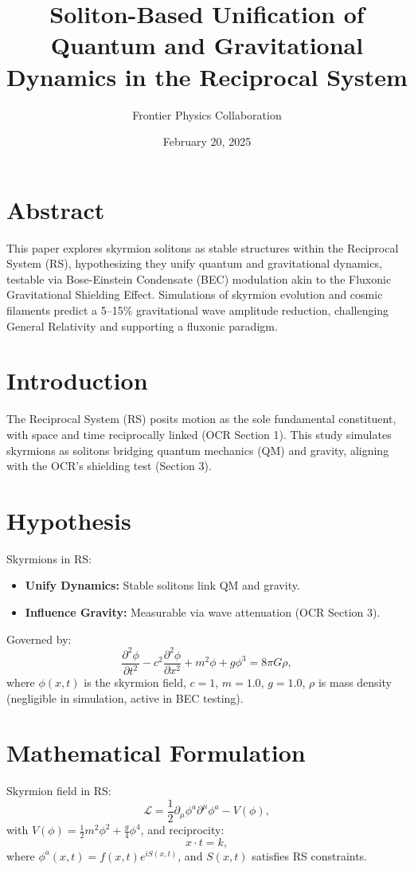 \documentclass{article}
\title{Soliton-Based Unification of Quantum and Gravitational Dynamics in the Reciprocal System}
\author{Frontier Physics Collaboration}
\date{February 20, 2025}
\begin{document}
\maketitle

\section*{Abstract}
This paper explores skyrmion solitons as stable structures within the Reciprocal System (RS), hypothesizing they unify quantum and gravitational dynamics, testable via Bose-Einstein Condensate (BEC) modulation akin to the Fluxonic Gravitational Shielding Effect. Simulations of skyrmion evolution and cosmic filaments predict a 5–15\% gravitational wave amplitude reduction, challenging General Relativity and supporting a fluxonic paradigm.

\section{Introduction}
The Reciprocal System (RS) posits motion as the sole fundamental constituent, with space and time reciprocally linked (OCR Section 1). This study simulates skyrmions as solitons bridging quantum mechanics (QM) and gravity, aligning with the OCR’s shielding test (Section 3).

\section{Hypothesis}
Skyrmions in RS:
\begin{itemize}
    \item \textbf{Unify Dynamics:} Stable solitons link QM and gravity.
    \item \textbf{Influence Gravity:} Measurable via wave attenuation (OCR Section 3).
\end{itemize}
Governed by:
\begin{equation}
\frac{\partial^2 \phi}{\partial t^2} - c^2 \frac{\partial^2 \phi}{\partial x^2} + m^2 \phi + g \phi^3 = 8 \pi G \rho,
\end{equation}
where \(\phi(x,t)\) is the skyrmion field, \(c = 1\), \(m = 1.0\), \(g = 1.0\), \(\rho\) is mass density (negligible in simulation, active in BEC testing).

\section{Mathematical Formulation}
Skyrmion field in RS:
\begin{equation}
\mathcal{L} = \frac{1}{2} \partial_{\mu} \phi^a \partial^{\mu} \phi^a - V(\phi),
\end{equation}
with \(V(\phi) = \frac{1}{2} m^2 \phi^2 + \frac{g}{4} \phi^4\), and reciprocity:
\begin{equation}
x \cdot t = k,
\end{equation}
where \(\phi^a(x,t) = f(x,t) e^{i S(x,t)}\), and \(S(x,t)\) satisfies RS constraints.
\end{document}
